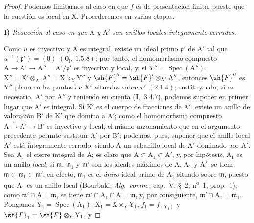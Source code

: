 \begin{proof}
Podemos limitarnos al caso en que $f$ es de presentación finita, puesto que la cuestión es local
en $\mathrm{X}$. Procederemos en varias etapas.

\medskip
\noindent\textbf{I)} \emph{Reducción al caso en que $\mathrm{A}$ y $\mathrm{A}'$ son anillos locales íntegramente cerrados.}

\medskip
Como $u$ es inyectivo y $\mathrm{A}$ es integral, existe un ideal primo $\mathfrak{p}'$ de $\mathrm{A}'$ tal que
$u^{-1}(\mathfrak{p}')=(0)$ $(\mathbf{0}_\mathrm{I},~1.5.8)$; por tanto, el homomorfismo compuesto $\mathrm{A}\to\mathrm{A}'\to\mathrm{A}''=\mathrm{A}'/\mathfrak{p}'$ es inyectivo
y local, y, si $\mathrm{Y}''=\operatorname{Spec}(\mathrm{A}'')$, $\mathrm{X}''=\mathrm{X}'\otimes_{\mathrm{A}'}\mathrm{A}''=\mathrm{X}\times_\mathrm{Y}\mathrm{Y}''$ y $\sh{F}''=\sh{F}'\otimes_{\mathrm{A}'}\mathrm{A}''$, entonces $\sh{F}''$ es $\mathrm{Y}''$-plano
en los puntos de $\mathrm{X}''$ situados sobre $x'$ $(2.1.4)$; sustituyendo, si es necesario, $\mathrm{A}'$ por $\mathrm{A}''$ y teniendo
en cuenta (\textbf{I},~$3.4.7$), podemos suponer en primer lugar que $\mathrm{A}'$ es integral. Si $\mathrm{K}'$ es el cuerpo de
fracciones de $\mathrm{A}'$, existe un anillo de valoración $\mathrm{B}'$ de $\mathrm{K}'$ que domina a $\mathrm{A}'$; como el homomorfismo compuesto
$\mathrm{A}\xrightarrow{u}\mathrm{A}'\to\mathrm{B}'$ es inyectivo y local, el mismo razonamiento que en
el argumento precedente permite sustituir $\mathrm{A}'$ por $\mathrm{B}'$; podemos, pues, suponer que el anillo local $\mathrm{A}'$ está íntegramente cerrado,
siendo $\mathrm{A}$ un subanillo local de $\mathrm{A}'$ dominado por $\mathrm{A}'$. Sea $\mathrm{A}_1$ el cierre integral de $\mathrm{A}$; es claro que
$\mathrm{A}\subset\mathrm{A}_1\subset\mathrm{A}'$, y, por hipótesis, $\mathrm{A}_1$ es un anillo \emph{local};
si $\mathfrak{m}$, $\mathfrak{m}_1$ y $\mathfrak{m}'$ son los ideales máximos de $\mathrm{A}$, $\mathrm{A}_1$ y $\mathrm{A}'$, se tiene $\mathfrak{m}\subset\mathfrak{m}_1\subset\mathfrak{m}'$; en efecto, $\mathfrak{m}_1$ es
el \emph{único} ideal primo de $\mathrm{A}_1$ situado sobre $\mathfrak{m}$, puesto que $\mathrm{A}_1$ es un anillo local (Bourbaki,
\emph{Alg.\ comm.}, cap.~V, \S~2, n\textsuperscript{o}~1, prop.~1); como $\mathfrak{m}'\cap\mathrm{A}=\mathfrak{m}$, se tiene $\mathfrak{m}'\cap\mathrm{A}_1\cap\mathrm{A}=\mathfrak{m}$,
y, por consiguiente, $\mathfrak{m}'\cap\mathrm{A}_1=\mathfrak{m}_1$. Pongamos $\mathrm{Y}_1=\operatorname{Spec}(\mathrm{A}_1)$, $\mathrm{X}_1=\mathrm{X}\times_\mathrm{Y}\mathrm{Y}_1$, $f_1=f_{(\mathrm{Y}_1)}$ y $\sh{F}_1=\sh{F}\otimes_\mathrm{Y}\mathrm{Y}_1$, y

\end{proof}
